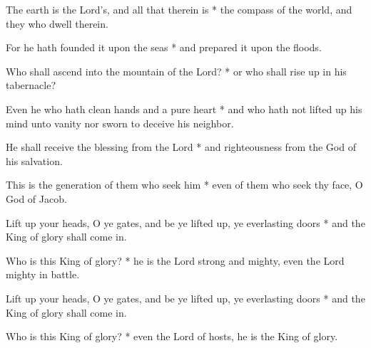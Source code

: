The earth is the Lord's, and all that therein is * the compass of the world, and they who dwell therein.

For he hath founded it upon the seas * and prepared it upon the floods.

Who shall ascend into the mountain of the Lord? * or who shall rise up in his tabernacle?

Even he who hath clean hands and a pure heart * and who hath not lifted up his mind unto vanity nor sworn to deceive his neighbor.

He shall receive the blessing from the Lord * and righteousness from the God of his salvation.

This is the generation of them who seek him * even of them who seek thy face, O God of Jacob.

Lift up your heads, O ye gates, and be ye lifted up, ye everlasting doors * and the King of glory shall come in.

Who is this King of glory? * he is the Lord strong and mighty, even the Lord mighty in battle.

Lift up your heads, O ye gates, and be ye lifted up, ye everlasting doors * and the King of glory shall come in.

Who is this King of glory? * even the Lord of hosts, he is the King of glory.